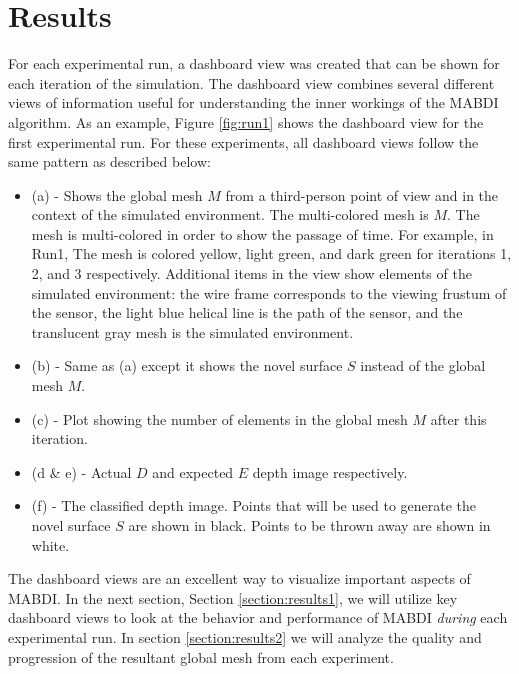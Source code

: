 \chapter{Results} \label{chapter:results}


For each experimental run, a dashboard view was created that can be shown for
each iteration of the simulation. The dashboard view combines several different
views of information useful for understanding the inner workings of the MABDI
algorithm. As an example, Figure \ref{fig:run1} shows the dashboard view for the
first experimental run. For these experiments, all dashboard views follow the
same pattern as described below:

\begin{itemize}
  \item (a) - Shows the global mesh $M$ from a third-person point of view and in
  the context of the simulated environment. The multi-colored mesh is $M$. The
  mesh is multi-colored in order to show the passage of time. For example, in
  Run1, The mesh is colored yellow, light green, and dark green for iterations
  1, 2, and 3 respectively. Additional items in the view show elements of the
  simulated environment: the wire frame corresponds to the viewing frustum of
  the sensor, the light blue helical line is the path of the sensor, and the
  translucent gray mesh is the simulated environment.
  \item (b) - Same as (a) except it shows the novel surface $S$ instead of
  the global mesh $M$.
  \item (c) - Plot showing the number of elements in the global mesh $M$
  after this iteration.
  \item (d \& e) - Actual $D$ and expected $E$ depth image
  respectively.
  \item (f) - The classified depth image. Points that will be used to generate
  the novel surface $S$ are shown in black. Points to be thrown away are shown
  in white.
\end{itemize}

The dashboard views are an excellent way to visualize important aspects of
MABDI. In the next section, Section \ref{section:results1}, we will utilize key
dashboard views to look at the behavior and performance of MABDI \emph{during}
each experimental run. In section \ref{section:results2} we will analyze the
quality and progression of the resultant global mesh from each experiment.


